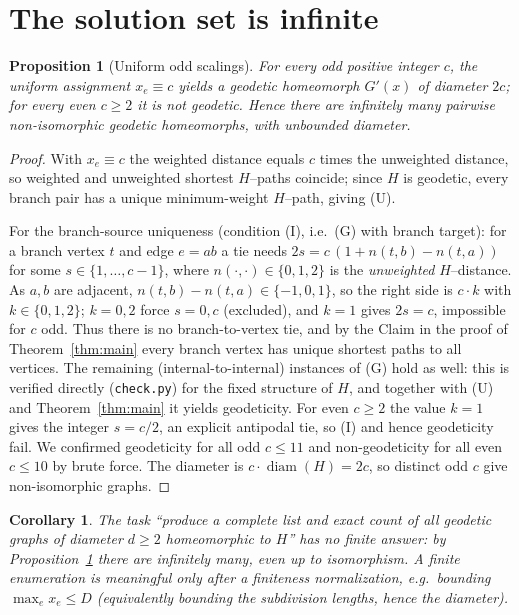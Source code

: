 \documentclass{amsart}
\newtheorem{proposition}{Proposition}
\newtheorem{corollary}{Corollary}
\theoremstyle{definition}
\begin{document}
\section{The solution set is infinite}

\begin{proposition}[Uniform odd scalings]\label{prop:infinite}
For every odd positive integer $c$, the uniform assignment $x_e\equiv c$ yields a
geodetic homeomorph $G'(x)$ of diameter $2c$; for every even $c\ge2$ it is not
geodetic. Hence there are infinitely many pairwise non-isomorphic geodetic
homeomorphs, with unbounded diameter.
\end{proposition}

\begin{proof}
With $x_e\equiv c$ the weighted distance equals $c$ times the unweighted
distance, so weighted and unweighted shortest $H$--paths coincide; since $H$ is
geodetic, every branch pair has a unique minimum-weight $H$--path, giving (U).

For the branch-source uniqueness (condition (I), i.e.\ (G) with branch target):
for a branch vertex $t$ and edge $e=ab$ a tie needs $2s=c\,(1+n(t,b)-n(t,a))$ for
some $s\in\{1,\dots,c-1\}$, where $n(\cdot,\cdot)\in\{0,1,2\}$ is the
\emph{unweighted} $H$--distance. As $a,b$ are adjacent, $n(t,b)-n(t,a)\in
\{-1,0,1\}$, so the right side is $c\cdot k$ with $k\in\{0,1,2\}$; $k=0,2$ force
$s=0,c$ (excluded), and $k=1$ gives $2s=c$, impossible for $c$ odd. Thus there is
no branch-to-vertex tie, and by the Claim in the proof of
Theorem~\ref{thm:main} every branch vertex has unique shortest paths to all
vertices. The remaining (internal-to-internal) instances of (G) hold as well:
this is verified directly (\texttt{check.py}) for the fixed structure of $H$, and
together with (U) and Theorem~\ref{thm:main} it yields geodeticity. For even
$c\ge2$ the value $k=1$ gives the integer $s=c/2$, an explicit antipodal tie, so
(I) and hence geodeticity fail. We confirmed geodeticity for all odd $c\le11$ and
non-geodeticity for all even $c\le10$ by brute force. The diameter is
$c\cdot\operatorname{diam}(H)=2c$, so distinct odd $c$ give non-isomorphic
graphs.
\end{proof}

\begin{corollary}\label{cor:illposed}
The task ``produce a complete list and exact \emph{count} of all geodetic graphs
of diameter $d\ge2$ homeomorphic to $H$'' has no finite answer: by
Proposition~\ref{prop:infinite} there are infinitely many, even up to
isomorphism. A finite enumeration is meaningful only after a finiteness
normalization, e.g.\ bounding $\max_e x_e\le D$ (equivalently bounding the
subdivision lengths, hence the diameter).
\end{corollary}
\end{document}

